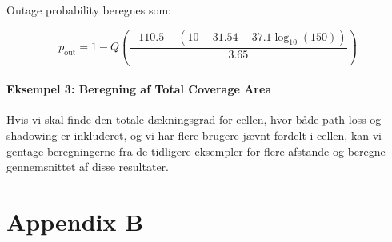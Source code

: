 \documentclass[a4paper,12pt]{book}
\begin{document}
	Outage probability beregnes som:
	
	\[
	p_{\text{out}} = 1 - Q\left(\frac{-110.5 - \left(10 - 31.54 - 37.1 \log_{10}(150)\right)}{3.65}\right)
	\]
	
	\subsubsection{Eksempel 3: Beregning af Total Coverage Area}
	
	Hvis vi skal finde den totale dækningsgrad for cellen, hvor både path loss og shadowing er inkluderet, og vi har flere brugere jævnt fordelt i cellen, kan vi gentage beregningerne fra de tidligere eksempler for flere afstande og beregne gennemsnittet af disse resultater.
	
	\chapter{Appendix B}
	
\end{document}
